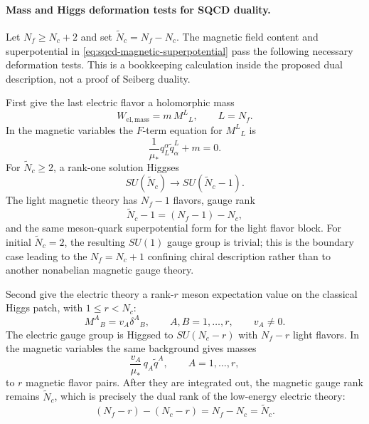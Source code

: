 \paragraph{Mass and Higgs deformation tests for SQCD duality.}
Let \(N_f\geq N_c+2\) and set \(\widetilde N_c=N_f-N_c\).  The magnetic
field content and superpotential in
\eqref{eq:sqcd-magnetic-superpotential} pass the following necessary
deformation tests.  This is a bookkeeping calculation inside the proposed
dual description, not a proof of Seiberg duality.

First give the last electric flavor a holomorphic mass
\[
  W_{\mathrm{el,mass}}=m\,M^L{}_L,\qquad L=N_f .
\]
In the magnetic variables the \(F\)-term equation for \(M^L{}_L\) is
\begin{equation}
  \frac1{\mu_*}q_L^\alpha\widetilde q^L_\alpha+m=0 .
  \label{eq:sqcd-mass-deformation-magnetic-fterm}
\end{equation}
For \(\widetilde N_c\geq2\), a rank-one solution Higgses
\[
  SU(\widetilde N_c)\longrightarrow SU(\widetilde N_c-1).
\]
The light magnetic theory has \(N_f-1\) flavors, gauge rank
\[
  \widetilde N_c-1=(N_f-1)-N_c,
\]
and the same meson-quark superpotential form for the light flavor block.
For initial \(\widetilde N_c=2\), the resulting \(SU(1)\) gauge group is
trivial; this is the boundary case leading to the \(N_f=N_c+1\) confining
chiral description rather than to another nonabelian magnetic gauge theory.

Second give the electric theory a rank-\(r\) meson expectation value on the
classical Higgs patch, with \(1\leq r<N_c\):
\[
  M^A{}_B=v_A\delta^A{}_B,\qquad A,B=1,\ldots,r,\qquad v_A\neq0 .
\]
The electric gauge group is Higgsed to \(SU(N_c-r)\) with \(N_f-r\) light
flavors.  In the magnetic variables the same background gives masses
\[
  \frac{v_A}{\mu_*}\,q_A\widetilde q^A,
  \qquad A=1,\ldots,r,
\]
to \(r\) magnetic flavor pairs.  After they are integrated out, the magnetic
gauge rank remains \(\widetilde N_c\), which is precisely the dual rank of
the low-energy electric theory:
\begin{equation}
  (N_f-r)-(N_c-r)=N_f-N_c=\widetilde N_c .
  \label{eq:sqcd-higgs-deformation-rank-test}
\end{equation}

